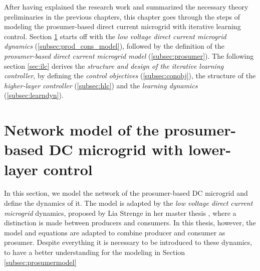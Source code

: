 After having explained the research work and summarized the necessary theory preliminaries in the previous chapters, this chapter goes through the steps of modeling the prosumer-based direct current microgrid with iterative learning control. Section \ref{sec:networkmodel} starts off with the \textit{low voltage direct current microgrid dynamics} (\ref{subsec:prod_cons_model}), followed by the definition of the \textit{prosumer-based direct current microgrid model} (\ref{subsec:prosumer}). The following section \ref{sec:ilc} derives the \textit{structure and design of the iterative learning controller}, by defining the \textit{control objectives} (\ref{subsec:conobj}), the structure of the \textit{higher-layer controller} (\ref{subsec:hlc}) and the \textit{learning dynamics} (\ref{subsec:learndyn}).

\section{Network model of the prosumer-based DC microgrid with lower-layer control}
\label{sec:networkmodel}
In this section, we model the network of the prosumer-based DC microgrid and define the dynamics of it. The model is adapted by the \textit{low voltage direct current microgrid} dynamics, proposed by Lia Strenge in her master thesis \cite{lia_master}, where a distinction is made between producers and consumers. In this thesis, however, the model and equations are adapted to combine producer and consumer as prosumer. Despite everything it is necessary to be introduced to these dynamics, to have a better understanding for the modeling in Section \ref{subsec:prosumermodel}

